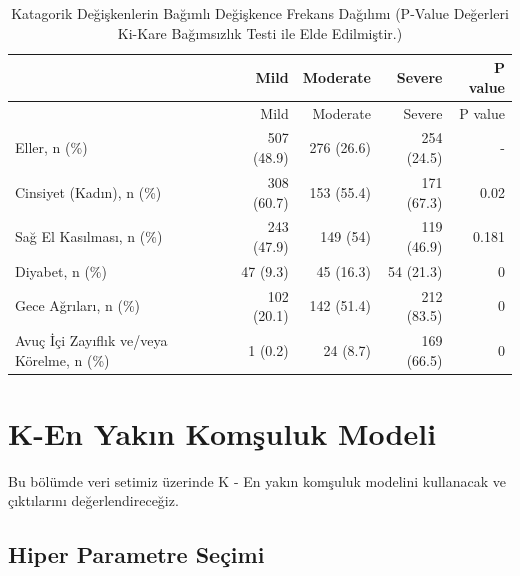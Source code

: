 \documentclass[12pt,twoside]{deuthesis}
\begin{document}
\begin{longtable}[]{@{}lrrrr@{}}
\caption{\label{tab:catvar} Katagorik Değişkenlerin Bağımlı Değişkence Frekans Dağılımı \tiny (P-Value Değerleri Ki-Kare Bağımsızlık Testi ile Elde Edilmiştir.)}\tabularnewline
\toprule
& Mild & Moderate & Severe & P value \\
\midrule
\endfirsthead
\toprule
& Mild & Moderate & Severe & P value \\
\midrule
\endhead
Eller, n (\%) & 507 (48.9) & 276 (26.6) & 254 (24.5) & - \\
Cinsiyet (Kadın), n (\%) & 308 (60.7) & 153 (55.4) & 171 (67.3) & 0.02 \\
Sağ El Kasılması, n (\%) & 243 (47.9) & 149 (54) & 119 (46.9) & 0.181 \\
Diyabet, n (\%) & 47 (9.3) & 45 (16.3) & 54 (21.3) & 0 \\
Gece Ağrıları, n (\%) & 102 (20.1) & 142 (51.4) & 212 (83.5) & 0 \\
Avuç İçi Zayıflık ve/veya Körelme, n (\%) & 1 (0.2) & 24 (8.7) & 169 (66.5) & 0 \\
\bottomrule
\end{longtable}
\hypertarget{k-en-yakux131n-komux15fuluk-modeli}{%
\section{K-En Yakın Komşuluk Modeli}\label{k-en-yakux131n-komux15fuluk-modeli}}

Bu bölümde veri setimiz üzerinde K - En yakın komşuluk modelini kullanacak ve çıktılarını değerlendireceğiz.

\hypertarget{hiper-parametre-seuxe7imi}{%
\subsection{Hiper Parametre Seçimi}\label{hiper-parametre-seuxe7imi}}
\end{document}
